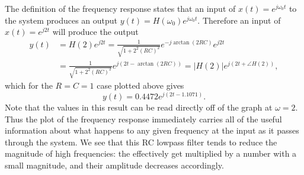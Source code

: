 \documentclass[10pt]{beamer}
\begin{document}
The definition of the frequency response states that an input of $x(t) = e^{j \omega_0 t}$ to the system produces an output $y(t) = H(\omega_0) e^{j \omega_0 t}$.  Therefore an input of $x(t) = e^{j 2 t}$ will produce the output
\begin{align*}
  y(t) &= H(2) e^{j 2 t} = \frac{1}{\sqrt{1 + 2^2 (RC)^2}} e^{-j \arctan(2 RC)} e^{j 2 t} \\
  & = \frac{1}{\sqrt{1 + 2^2 (RC)^2}} e^{j( 2t - \arctan(2 RC))}
  = |H(2)| e^{j (2t + \angle H(2))},
\end{align*}
which for the $R = C = 1$ case plotted above gives
\begin{equation*}
  y(t) = 0.4472 e^{j (2t - 1.1071)}.
\end{equation*}
Note that the values in this result can be read directly off of the graph at $\omega = 2$.  Thus the plot of the frequency response immediately carries all of the useful information about what happens to any given frequency at the input as it passes through the system.  We see that this RC lowpass filter tends to reduce the magnitude of high frequencies:  the effectively get multiplied by a number with a small magnitude, and their amplitude decreases accordingly.  
\end{document}
